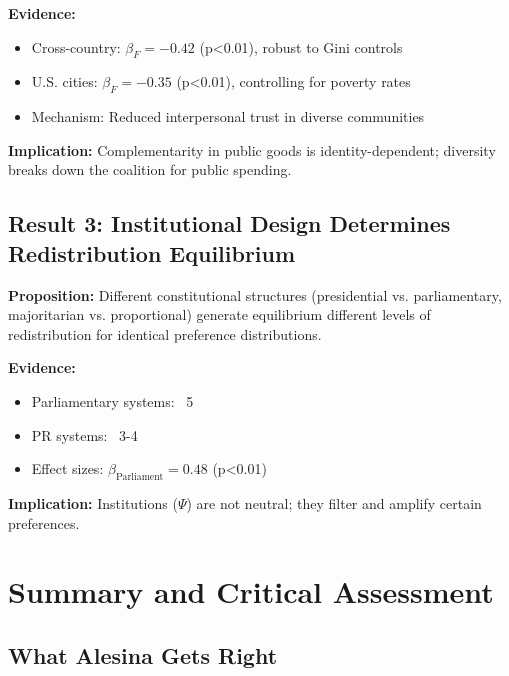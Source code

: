 \textbf{Evidence:}
\begin{itemize}
\item Cross-country: $\beta_{F} = -0.42$ (p<0.01), robust to Gini controls
\item U.S. cities: $\beta_{F} = -0.35$ (p<0.01), controlling for poverty rates
\item Mechanism: Reduced interpersonal trust in diverse communities
\end{itemize}

\textbf{Implication:} Complementarity in public goods is identity-dependent; diversity breaks down the coalition for public spending.

\subsection{Result 3: Institutional Design Determines Redistribution Equilibrium}

\textbf{Proposition:} Different constitutional structures (presidential vs. parliamentary, majoritarian vs. proportional) generate equilibrium different levels of redistribution for identical preference distributions.

\textbf{Evidence:}
\begin{itemize}
\item Parliamentary systems: ~5%
\item PR systems: ~3-4%
\item Effect sizes: $\beta_{\text{Parliament}} = 0.48$ (p<0.01)
\end{itemize}

\textbf{Implication:} Institutions ($\Psi$) are not neutral; they filter and amplify certain preferences.


\section{Summary and Critical Assessment}
\label{sec:alesina-summary}

\subsection{What Alesina Gets Right}


